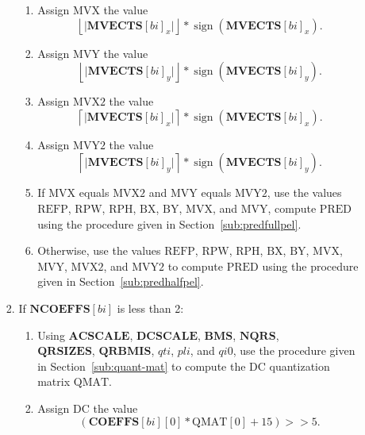 \documentclass[9pt,letterpaper]{book}
\newcommand{\idx}[1]{{\ensuremath{\mathit{#1}}}}
\newcommand{\qti}{\idx{qti}}
\newcommand{\pli}{\idx{pli}}
\newcommand{\bi}{\idx{bi}}
\newcommand{\bitvar}[1]{\ensuremath{\mathbf{\bm{#1}}}}
\newcommand{\locvar}[1]{\ensuremath{\mathrm{#1}}}
\newcommand{\sign}{\ensuremath{\mathop{\mathrm{sign}}\nolimits}}
\numberwithin{equation}{chapter}
\numberwithin{figure}{chapter}
\numberwithin{table}{chapter}
\begin{document}
\begin{enumerate}
\begin{enumerate}
\begin{enumerate}
\begin{enumerate}
\item
Assign \locvar{MVX} the value
\begin{equation*}
 \left\lfloor\lvert\bitvar{MVECTS}[\locvar{\bi}]_x\rvert\right\rfloor*
 \sign(\bitvar{MVECTS}[\locvar{\bi}]_x).
\end{equation*}
\item
Assign \locvar{MVY} the value
\begin{equation*}
 \left\lfloor\lvert\bitvar{MVECTS}[\locvar{\bi}]_y\rvert\right\rfloor*
 \sign(\bitvar{MVECTS}[\locvar{\bi}]_y).
\end{equation*}
\item
Assign \locvar{MVX2} the value
\begin{equation*}
 \left\lceil\lvert\bitvar{MVECTS}[\locvar{\bi}]_x\rvert\right\rceil*
 \sign(\bitvar{MVECTS}[\locvar{\bi}]_x).
\end{equation*}
\item
Assign \locvar{MVY2} the value
\begin{equation*}
 \left\lceil\lvert\bitvar{MVECTS}[\locvar{\bi}]_y\rvert\right\rceil*
 \sign(\bitvar{MVECTS}[\locvar{\bi}]_y).
\end{equation*}
\item
If \locvar{MVX} equals \locvar{MVX2} and \locvar{MVY} equals \locvar{MVY2},
 use the values \locvar{REFP}, \locvar{RPW}, \locvar{RPH}, \locvar{BX},
 \locvar{BY}, \locvar{MVX}, and \locvar{MVY}, compute \locvar{PRED} using the
 procedure given in Section~\ref{sub:predfullpel}.
\item
Otherwise, use the values \locvar{REFP}, \locvar{RPW}, \locvar{RPH},
 \locvar{BX}, \locvar{BY}, \locvar{MVX}, \locvar{MVY}, \locvar{MVX2}, and
 \locvar{MVY2} to compute \locvar{PRED} using the procedure given in
 Section~\ref{sub:predhalfpel}.
\end{enumerate}
\item
If $\bitvar{NCOEFFS}[\locvar{\bi}]$ is less than 2:
\begin{enumerate}
\item
Using \bitvar{ACSCALE}, \bitvar{DCSCALE}, \bitvar{BMS}, \bitvar{NQRS}, \\
 \bitvar{QRSIZES}, \bitvar{QRBMIS}, \locvar{\qti}, \locvar{\pli}, and
 \locvar{\idx{qi0}}, use the procedure given in Section~\ref{sub:quant-mat} to
 compute the DC quantization matrix \locvar{QMAT}.
\item
Assign \locvar{DC} the value
\begin{equation*}
 (\bitvar{COEFFS}[\bitvar{\bi}][0]*\locvar{QMAT}[0]+15)>>5.
\end{equation*}

\end{enumerate}
\end{enumerate}
\end{enumerate}
\end{enumerate}
\end{document}
